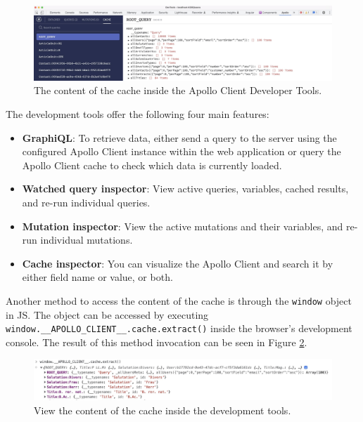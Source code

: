 \ifshowImages
\begin{figure}[H]
  \centering
  \includegraphics[width=1\linewidth]{images/background/graphql/apollo/apollo-dev-tools.jpg}
  \caption{The content of the cache inside the Apollo Client Developer Tools.}\label{fig:background:graphql:apollo:apollo-dev-tools}
\end{figure}
\fi

\noindent The development tools offer the following four main features: \cite{misc:-:background:graphql:apollo-developer-tools}

\begin{itemize}
  \item \textbf{GraphiQL}: To retrieve data, either send a query to the server using the configured Apollo Client instance within the web application or query the Apollo Client cache to check which data is currently loaded.
  \item \textbf{Watched query inspector}: View active queries, variables, cached results, and re-run individual queries.
  \item \textbf{Mutation inspector}: View the active mutations and their variables, and re-run individual mutations.
  \item \textbf{Cache inspector}: You can visualize the Apollo Client and search it by either field name or value, or both.
\end{itemize}

\noindent Another method to access the content of the cache is through the \texttt{window} object in \ac{JS}. The object can be accessed by executing \texttt{window.\_\_APOLLO\_CLIENT\_\_.cache.extract()} inside the browser's development console. The result of this method invocation can be seen in Figure \ref{fig:background:graphql:apollo:apollo-cache-browser-window}.

\ifshowImages
  \begin{figure}[H]
    \centering
    \includegraphics[width=1\linewidth]{images/background/graphql/apollo/apollo-cache-browser-window.jpg}
    \caption{View the content of the cache inside the development tools.}\label{fig:background:graphql:apollo:apollo-cache-browser-window}
  \end{figure}
\fi

